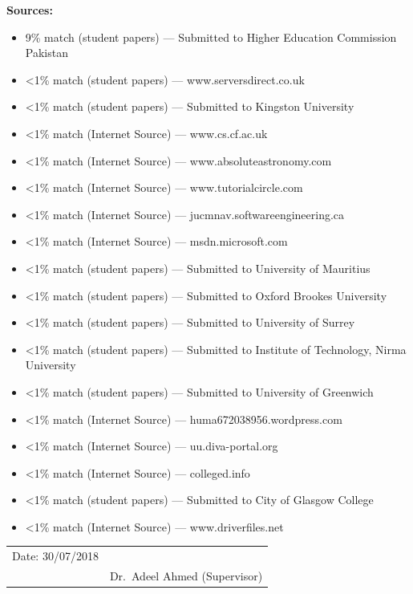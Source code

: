 \vspace{1.5cm}
\noindent\textbf{Sources:}
\begin{itemize}[noitemsep]
    \item 9\% match (student papers) --- Submitted to Higher Education Commission Pakistan
    \item \textless1\% match (student papers) --- www.serversdirect.co.uk
    \item \textless1\% match (student papers) --- Submitted to Kingston University
    \item \textless1\% match (Internet Source) --- www.cs.cf.ac.uk
    \item \textless1\% match (Internet Source) --- www.absoluteastronomy.com
    \item \textless1\% match (Internet Source) --- www.tutorialcircle.com
    \item \textless1\% match (Internet Source) --- jucmnav.softwareengineering.ca
    \item \textless1\% match (Internet Source) --- msdn.microsoft.com
    \item \textless1\% match (student papers) --- Submitted to University of Mauritius
    \item \textless1\% match (student papers) --- Submitted to Oxford Brookes University
    \item \textless1\% match (student papers) --- Submitted to University of Surrey
    \item \textless1\% match (student papers) --- Submitted to Institute of Technology, Nirma University
    \item \textless1\% match (student papers) --- Submitted to University of Greenwich
    \item \textless1\% match (Internet Source) --- huma672038956.wordpress.com
    \item \textless1\% match (Internet Source) --- uu.diva-portal.org
    \item \textless1\% match (Internet Source) --- colleged.info
    \item \textless1\% match (student papers) --- Submitted to City of Glasgow College
    \item \textless1\% match (Internet Source) --- www.driverfiles.net
\end{itemize}

\vspace{1.5cm}
\noindent\begin{tabular}{@{}p{}r@{}}
Date: 30/07/2018 & \underline{\hspace{6cm}}\\
                 & Dr.\ Adeel Ahmed (Supervisor)\\
\end{tabular}

\clearpage
